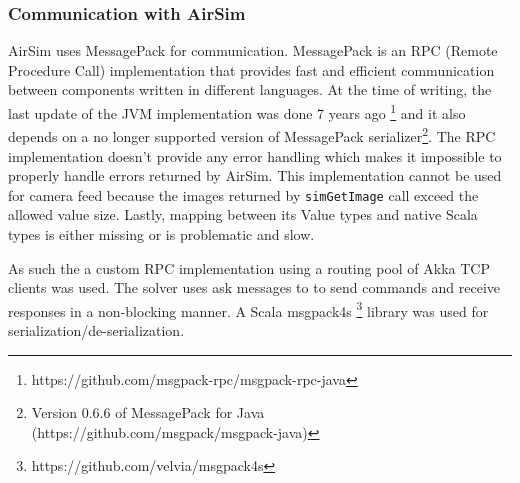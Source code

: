 \documentclass{article}
\begin{document}
\subsubsection{Communication with AirSim}
AirSim uses MessagePack \cite{messagepack} for communication. MessagePack is an RPC (Remote Procedure Call) implementation that provides fast and efficient communication between components written in different languages. At the time of writing, the last update of the JVM implementation was done 7 years ago \footnote{https://github.com/msgpack-rpc/msgpack-rpc-java} and it also depends on a no longer supported version of MessagePack serializer\footnote{Version 0.6.6 of MessagePack for Java (https://github.com/msgpack/msgpack-java)}. The RPC implementation doesn't provide any error handling which makes it impossible to properly handle errors returned by AirSim. This implementation cannot be used for camera feed because the images returned by \verb|simGetImage| call exceed the allowed value size. Lastly, mapping between its Value types and native Scala types is either missing or is problematic and slow.  

As such the a custom RPC implementation using a routing pool of Akka TCP clients was used. The solver uses ask messages to to send commands and receive responses in a non-blocking manner. A Scala msgpack4s \footnote{https://github.com/velvia/msgpack4s} library was used for serialization/de-serialization.


\end{document}

